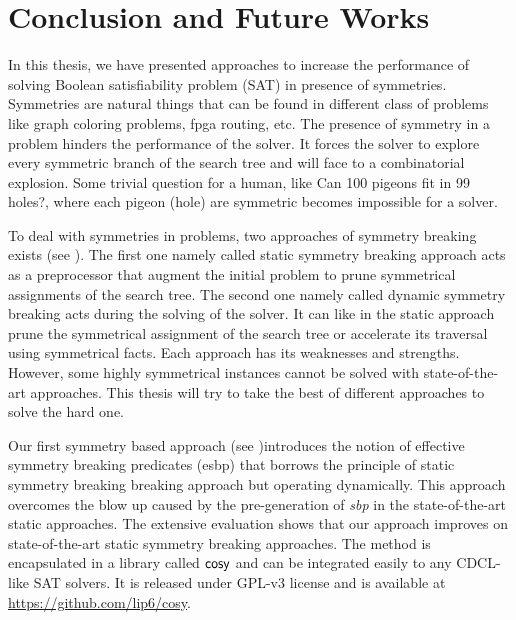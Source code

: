 \chapter{Conclusion and Future Works}\label{chap:conclu}



In this thesis, we have presented approaches to increase the performance of solving 
Boolean satisfiability problem (SAT) in presence of symmetries. 
Symmetries are natural things that can be found in different class of problems like
graph coloring problems, fpga routing, etc.
The presence of symmetry in a problem hinders the performance of the solver. It forces
the solver to explore every symmetric branch of the search tree and will face to a combinatorial explosion.
Some trivial question for a human, like Can 100 pigeons fit in 99 holes?,
where each pigeon (hole) are symmetric becomes impossible for a solver. 


To deal with symmetries in problems, two approaches of symmetry breaking exists (see ).
The first one namely called static symmetry breaking approach acts as a preprocessor that augment the initial
problem to prune symmetrical assignments of the search tree. The second one namely called dynamic symmetry breaking 
acts during the solving of the solver. It can like in the static approach prune the symmetrical assignment of the 
search tree or accelerate its traversal using symmetrical facts.
Each approach has its weaknesses and strengths. However, some highly symmetrical instances cannot be solved with
state-of-the-art approaches. This thesis will try to take the best of different approaches to solve 
the hard one.


%
%

Our first symmetry based approach (see )introduces the notion of effective symmetry breaking predicates (esbp)
that borrows the principle of static symmetry breaking breaking approach but operating dynamically\cite{metin2018cdclsym}.
This approach overcomes the blow up caused by the pre-generation of \textit{sbp} in the state-of-the-art 
static approaches. The extensive evaluation shows that our approach improves on state-of-the-art static 
symmetry breaking approaches.
The method is encapsulated in a library called $\textsf{cosy}$ and can be integrated easily to any
CDCL-like SAT solvers. It is released under GPL-v3 license and is available at \url{https://github.com/lip6/cosy}.

